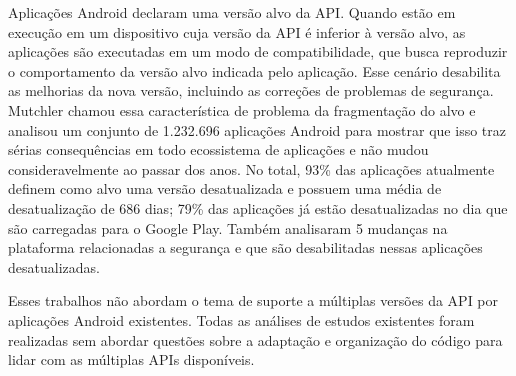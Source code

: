 Aplicações Android declaram uma versão alvo da API. Quando estão em execução em
um dispositivo cuja versão da API é inferior à versão alvo, as aplicações são
executadas em um modo de compatibilidade, que busca reproduzir o comportamento
da versão alvo indicada pelo aplicação. Esse cenário desabilita as melhorias da
nova versão, incluindo as correções de problemas de segurança. Mutchler \cite{Mutchler2016}
chamou essa característica de problema da fragmentação do alvo e analisou um
conjunto de 1.232.696 aplicações Android para mostrar que isso traz sérias
consequências em todo ecossistema de aplicações e não mudou consideravelmente ao
passar dos anos. No total, 93\% das aplicações atualmente definem como alvo uma
versão desatualizada e possuem uma média de desatualização de 686 dias; 79\% das
aplicações já estão desatualizadas no dia que são carregadas para o Google Play.
Também analisaram 5 mudanças na plataforma relacionadas a segurança e que são
desabilitadas nessas aplicações desatualizadas.

Esses trabalhos não abordam o tema de suporte a múltiplas versões da API por aplicações
Android existentes. Todas as análises de estudos existentes foram realizadas sem
abordar questões sobre a adaptação e organização do código para lidar com as
múltiplas APIs disponíveis.

